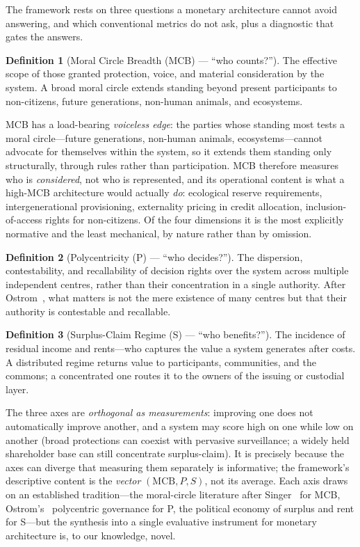 \documentclass[11pt]{article}
\theoremstyle{definition}
\newtheorem{definition}{Definition}
\begin{document}
The framework rests on three questions a monetary architecture cannot avoid
answering, and which conventional metrics do not ask, plus a diagnostic that gates
the answers.

\begin{definition}[Moral Circle Breadth (MCB) --- ``who counts?'']
The effective scope of those granted protection, voice, and material consideration by
the system. A broad moral circle extends standing beyond present participants to
non-citizens, future generations, non-human animals, and ecosystems.
\end{definition}

MCB has a load-bearing \emph{voiceless edge}: the parties whose standing most tests a
moral circle---future generations, non-human animals, ecosystems---cannot advocate
for themselves within the system, so it extends them standing only structurally,
through rules rather than participation. MCB therefore measures who is
\emph{considered}, not who is represented, and its operational content is what a
high-MCB architecture would actually \emph{do}: ecological reserve requirements,
intergenerational provisioning, externality pricing in credit allocation,
inclusion-of-access rights for non-citizens. Of the four dimensions it is the most
explicitly normative and the least mechanical, by nature rather than by omission.

\begin{definition}[Polycentricity (P) --- ``who decides?'']
The dispersion, contestability, and recallability of decision rights over the system
across multiple independent centres, rather than their concentration in a single
authority. After Ostrom~\cite{ostrom1990}, what matters is not the mere existence of
many centres but that their authority is contestable and recallable.
\end{definition}

\begin{definition}[Surplus-Claim Regime (S) --- ``who benefits?'']
The incidence of residual income and rents---who captures the value a system
generates after costs. A distributed regime returns value to participants,
communities, and the commons; a concentrated one routes it to the owners of the
issuing or custodial layer.
\end{definition}

The three axes are \emph{orthogonal as measurements}: improving one does not
automatically improve another, and a system may score high on one while low on
another (broad protections can coexist with pervasive surveillance; a widely held
shareholder base can still concentrate surplus-claim). It is precisely because the
axes can diverge that measuring them separately is informative; the framework's
descriptive content is the \emph{vector} $(\text{MCB}, P, S)$, not its average. Each
axis draws on an established tradition---the moral-circle literature after
Singer~\cite{singer1981} for MCB, Ostrom's~\cite{ostrom1990} polycentric governance
for P, the political economy of surplus and rent for S---but the synthesis into a
single evaluative instrument for monetary architecture is, to our knowledge, novel.
\end{document}
